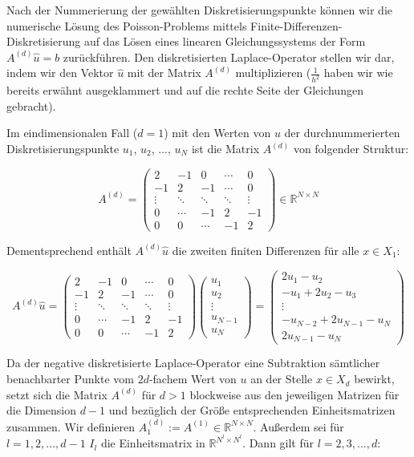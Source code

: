 \documentclass{scrartcl}
\newcommand{\R}{\mathbb{R}}
\begin{document}
Nach der Nummerierung der gewählten Diskretisierungspunkte können wir die numerische Lösung des Poisson-Problems mittels Finite-Differenzen-Diskretisierung auf das Lösen eines linearen Gleichungssystems der Form $A^{(d)}\hat{u}=b$ zurückführen.
Den diskretisierten Laplace-Operator stellen wir dar, indem wir den Vektor $\hat{u}$ mit der Matrix $A^{(d)}$ multiplizieren ($\frac{1}{h^2}$ haben wir wie bereits erwähnt ausgeklammert und auf die rechte Seite der Gleichungen gebracht).

Im eindimensionalen Fall ($d=1$) mit den Werten von $u$ der durchnummerierten Diskretisierungspunkte $u_1$, $u_2$, ..., $u_N$ ist die Matrix $A^{(d)}$ von folgender Struktur:

\[A^{(d)}=
\begin{pmatrix}
   2 & -1 &  0 & \cdots & 0 \\
  -1 &  2 & -1 & \cdots & 0 \\
   \vdots & \ddots & \ddots & \ddots & \vdots \\
   0 & \cdots & -1 &  2 & -1 \\
   0 & 0 & \cdots & -1 &  2
\end{pmatrix}
\in\R^{N\times N}
\]


Dementsprechend enthält $A^{(d)}\hat{u}$ die zweiten finiten Differenzen für alle $x \in X_1$:

\[A^{(d)}\hat{u}=
\begin{pmatrix}
   2 & -1 &  0 & \cdots & 0 \\
  -1 &  2 & -1 & \cdots & 0 \\
   \vdots & \ddots & \ddots & \ddots & \vdots \\
   0 & \cdots & -1 &  2 & -1 \\
   0 & 0 & \cdots & -1 &  2
\end{pmatrix}
\begin{pmatrix}
  u_1\\
  u_2\\
  \vdots\\
  u_{N-1}\\
  u_N
\end{pmatrix}
=
\begin{pmatrix}
  2u_1-u_2\\
  -u_1+2u_2-u_3\\
  \vdots\\
  -u_{N-2}+2u_{N-1}-u_N\\
  2u_{N-1}-u_N
\end{pmatrix}
\]


Da der negative diskretisierte Laplace-Operator eine Subtraktion sämtlicher benachbarter Punkte vom $2d$-fachem Wert von $u$ an der Stelle $x \in X_d$ bewirkt, setzt sich die Matrix $A^{(d)}$ für $d > 1$ blockweise aus den jeweiligen Matrizen für die Dimension $d-1$ und bezüglich der Größe entsprechenden Einheitsmatrizen zusammen. Wir definieren $A^{(d)}_1 := A^{(1)} \in \R^{N\times N}$. Außerdem sei für $l = 1, 2, ..., d-1$ $I_l$ die Einheitsmatrix in $\R^{N^l \times N^l}$. Dann gilt für $l = 2, 3, ..., d$:
\end{document}
